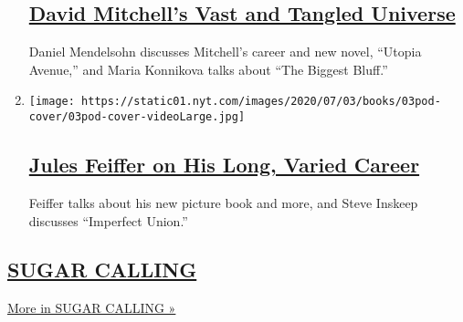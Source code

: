 \begin{enumerate}
  \hypertarget{david-mitchells-vast-and-tangled-universe}{%
  \subsection{\texorpdfstring{\href{/2020/07/10/books/review/david-mitchell-utopia-avenue-daniel-mendelsohn-biggest-bluff-poker-maria-konnikova.html}{David
  Mitchell's Vast and Tangled
  Universe}}{David Mitchell's Vast and Tangled Universe}}\label{david-mitchells-vast-and-tangled-universe}}

  Daniel Mendelsohn discusses Mitchell's career and new novel, ``Utopia
  Avenue,'' and Maria Konnikova talks about ``The Biggest Bluff.''
\item
  \texttt{[image: https://static01.nyt.com/images/2020/07/03/books/03pod-cover/03pod-cover-videoLarge.jpg]}

  \hypertarget{jules-feiffer-on-his-long-varied-career}{%
  \subsection{\texorpdfstring{\href{/2020/07/03/books/review/podcast-jules-feiffer-smart-george-steve-inskeep-imperfect-union.html}{Jules
  Feiffer on His Long, Varied
  Career}}{Jules Feiffer on His Long, Varied Career}}\label{jules-feiffer-on-his-long-varied-career}}

  Feiffer talks about his new picture book and more, and Steve Inskeep
  discusses ``Imperfect Union.''
\end{enumerate}

\hypertarget{sugar-calling}{%
\subsection{\texorpdfstring{\href{/column/sugar-calling}{SUGAR
CALLING}}{SUGAR CALLING}}\label{sugar-calling}}

\href{/column/sugar-calling}{More in SUGAR CALLING »}

